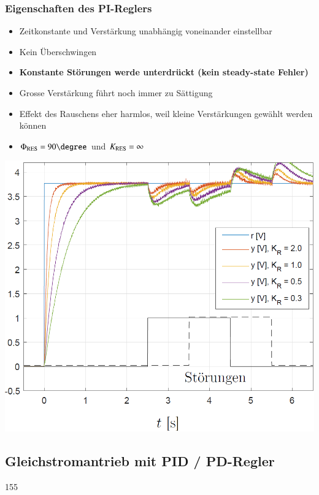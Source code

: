 \subsubsection{Eigenschaften des PI-Reglers}

\begin{minipage}[c]{0.48\columnwidth}
    \begin{itemize}
        \item Zeitkonstante und Verstärkung unabhängig voneinander einstellbar
        \item Kein Überschwingen
        \item \textbf{Konstante Störungen werde unterdrückt (kein steady-state Fehler)}
        \item Grosse Verstärkung führt noch immer zu Sättigung
        \item Effekt des Rauschens eher harmlos, weil kleine Verstärkungen gewählt werden können
        \item $\Phi_{\rm RES} = 90 \degree$ und $K_{\rm RES} = \infty$
    \end{itemize}
\end{minipage}
\hfill
\begin{minipage}[c]{0.45\columnwidth}
    \includegraphics[width=\columnwidth]{images/gleichstromantrieb_pi-regler_step_response.png}
\end{minipage}


\subsection{Gleichstromantrieb mit PID / PD-Regler}{155}

